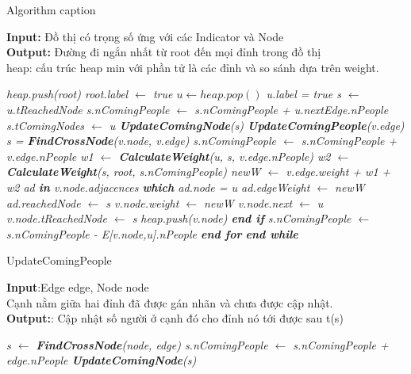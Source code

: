 \documentclass{article}
\begin{document}
    \begin{algorithm}
    \caption{Algorithm caption}
    \label{alg:algorithm-label}
    \textbf{Input:} Đồ thị có trọng số ứng với các Indicator và Node\\
    \textbf{Output:} Đường đi ngắn nhất từ root đến mọi đỉnh trong đồ thị\\
    heap: cấu trúc heap min với phần tử là các đỉnh và so sánh dựa 
    trên weight.
    \begin{algorithmic}[1]
        \em
        \State heap.push(root)
        \State root.label $\gets$ true
        \State $u \gets heap.pop()$
        \State u.label = true
        \State s $\gets$ u.tReachedNode
        \State s.nComingPeople $\gets$ s.nComingPeople + u.nextEdge.nPeople
        \State s.tComingNodes $\gets$ u
        \State \textbf{UpdateComingNode}(s)
        \State \textbf{UpdateComingPeople}(v.edge)
        \EndFor
        \State s = \textbf{FindCrossNode}(v.node, v.edge)
        \State s.nComingPeople $\gets$ s.nComingPeople + v.edge.nPeople
        \State w1 $\gets$ \textbf{CalculateWeight}(u, s, v.edge.nPeople)
        \State w2 $\gets$ \textbf{CalculateWeight}(s, root, s.nComingPeople)
        \State newW $\gets$ v.edge.weight + w1 + w2
        \State ad \textbf{in} v.node.adjacences \textbf{which} ad.node = u
        \State ad.edgeWeight $\gets$ newW
        \State ad.reachedNode $\gets$ s
        \State v.node.weight $\gets$ newW
        \State v.node.next $\gets$ u 
        \State v.node.tReachedNode $\gets$ s
        \State heap.push(v.node)
        \EndIf
        \State \textbf{end if}
        \State s.nComingPeople $\gets$ s.nComingPeople - E[v.node,u].nPeople
        \EndFor
        \textbf{end for}
        \EndWhile
        \textbf{end while}
    \EndProcedure
    \end{algorithmic}
    \end{algorithm}

    \begin{algorithm}
        \caption{UpdateComingPeople}
        \textbf{Input}:Edge edge, Node node \\ 
        Cạnh nằm giữa hai đỉnh đã được gán nhãn và chưa được cập nhật. \\
        \textbf{Output:}: Cập nhật số người ở cạnh đó cho đỉnh nó tới được sau t(s)

        \begin{algorithmic}
            \em
            \State s $\gets$ \textbf{FindCrossNode}(node, edge)
            \State s.nComingPeople $\gets$ s.nComingPeople + edge.nPeople
            \State \textbf{UpdateComingNode}(s)
            \EndProcedure
        \end{algorithmic}
    \end{algorithm}
    
\end{document}
